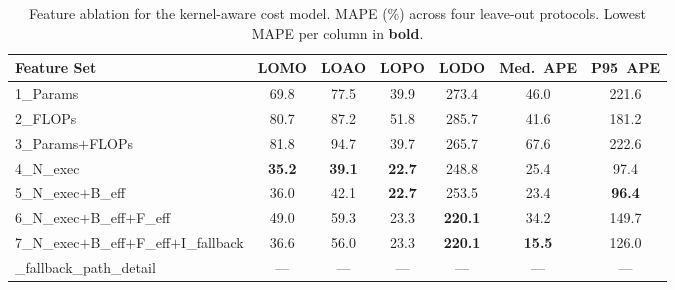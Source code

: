 \begin{table}[t]
\centering
\caption{Feature ablation for the kernel-aware cost model. MAPE (\%) across four leave-out protocols. Lowest MAPE per column in \textbf{bold}.}
\label{tab:cost_model_ablation}
\begin{tabular}{lcccccc}
\toprule
Feature Set & LOMO & LOAO & LOPO & LODO & Med.~APE & P95~APE \\
\midrule
1\_Params & 69.8 & 77.5 & 39.9 & 273.4 & 46.0 & 221.6 \\
2\_FLOPs & 80.7 & 87.2 & 51.8 & 285.7 & 41.6 & 181.2 \\
3\_Params$+$FLOPs & 81.8 & 94.7 & 39.7 & 265.7 & 67.6 & 222.6 \\
4\_N\_exec & \textbf{35.2} & \textbf{39.1} & \textbf{22.7} & 248.8 & 25.4 & 97.4 \\
5\_N\_exec$+$B\_eff & 36.0 & 42.1 & \textbf{22.7} & 253.5 & 23.4 & \textbf{96.4} \\
6\_N\_exec$+$B\_eff$+$F\_eff & 49.0 & 59.3 & 23.3 & \textbf{220.1} & 34.2 & 149.7 \\
7\_N\_exec$+$B\_eff$+$F\_eff$+$I\_fallback & 36.6 & 56.0 & 23.3 & \textbf{220.1} & \textbf{15.5} & 126.0 \\
\_fallback\_path\_detail & — & — & — & — & — & — \\
\bottomrule
\end{tabular}
\end{table}
